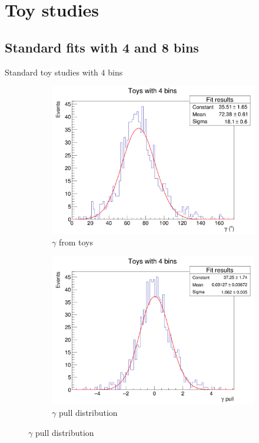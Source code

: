 \documentclass{beamer}
\begin{document}
\section{Toy studies}
\subsection{Standard fits with 4 and 8 bins}
\begin{frame}{Standard toy studies with $4$ bins}
  \begin{figure}
    \centering
    \vspace{-0.2cm}
    \begin{subfigure}{0.5\textwidth}
      \includegraphics[width = 1.0\textwidth]{Toy_Standard_4Bins.png}
      \caption{$\gamma$ from toys}
    \end{subfigure}%
    \begin{subfigure}{0.5\textwidth}
      \includegraphics[width = 1.0\textwidth]{Toy_Standard_4Bins_Pull.png}
      \caption{$\gamma$ pull distribution}
    \end{subfigure}
  \end{figure}
\end{frame}
\end{document}
